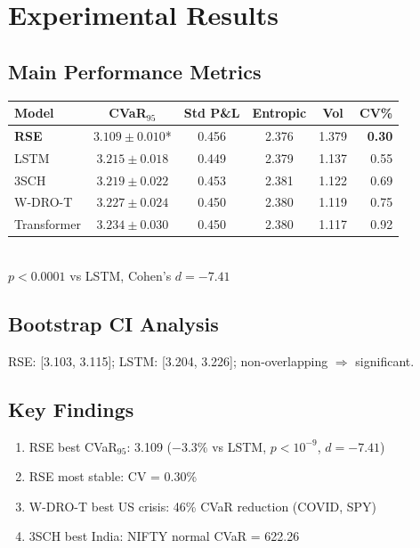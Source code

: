 \documentclass[11pt]{article}
\begin{document}
\section{Experimental Results}

\subsection{Main Performance Metrics}
\begin{resultbox}
\begin{table}[H]\centering\small
\begin{tabular}{@{}lccccr@{}}
\toprule
\textbf{Model} & \textbf{CVaR$_{95}$} & \textbf{Std P\&L} & \textbf{Entropic} & \textbf{Vol} & \textbf{CV\%} \\\midrule
\textbf{RSE} & $\mathbf{3.109 \pm 0.010}$* & 0.456 & 2.376 & 1.379 & \textbf{0.30} \\
LSTM & $3.215 \pm 0.018$ & 0.449 & 2.379 & 1.137 & 0.55 \\
3SCH & $3.219 \pm 0.022$ & 0.453 & 2.381 & 1.122 & 0.69 \\
W-DRO-T & $3.227 \pm 0.024$ & 0.450 & 2.380 & 1.119 & 0.75 \\
Transformer & $3.234 \pm 0.030$ & 0.450 & 2.380 & 1.117 & 0.92 \\
\bottomrule
\end{tabular}
\\[2pt]{\footnotesize *$p < 0.0001$ vs LSTM, Cohen's $d = -7.41$}
\end{table}
\end{resultbox}

\subsection{Bootstrap CI Analysis}
RSE: [3.103, 3.115]; LSTM: [3.204, 3.226]; non-overlapping $\Rightarrow$ significant.

\subsection{Key Findings}
\begin{keybox}[Summary]
\begin{enumerate}[noitemsep,leftmargin=*]
\item RSE best CVaR$_{95}$: 3.109 ($-3.3\%$ vs LSTM, $p < 10^{-9}$, $d = -7.41$)
\item RSE most stable: CV = 0.30\%
\item W-DRO-T best US crisis: 46\% CVaR reduction (COVID, SPY)
\item 3SCH best India: NIFTY normal CVaR = 622.26
\end{enumerate}
\end{keybox}
\end{document}
